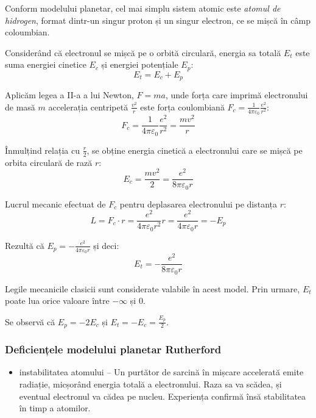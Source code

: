 Conform modelului planetar, cel mai simplu sistem atomic este
\emph{atomul de hidrogen}, format dintr-un singur proton și un singur electron,
ce se mișcă în câmp coloumbian.

Considerând că electronul se mișcă pe o orbită circulară, energia sa totală
$E_t$ este suma energiei cinetice $E_c$ și energiei potențiale $E_p$:
\[ E_t = E_c + E_p \]

Aplicăm legea a II-a a lui Newton, \( F = ma \), unde forța care imprimă
electronului de masă $m$ accelerația centripetă \( \frac{v^2}{r} \) este forța
coulombiană \( F_c = \frac{1}{4\pi\varepsilon_0} \frac{e^2}{r^2} \):
\[ F_c = \frac{1}{4\pi\varepsilon_0} \frac{e^2}{r^2} = \frac{mv^2}{r} \]

Înmulțind relația cu \( \frac{r}{2} \), se obține energia cinetică a
electronului care se mișcă pe orbita circulară de rază $r$:
\[ E_c = \frac{mv^2}{2} = \frac{e^2}{8\pi\varepsilon_0 r} \]

Lucrul mecanic efectuat de $F_c$ pentru deplasarea electronului pe distanța
$r$:
\[
    L = F_c \cdot r = \frac{e^2}{4\pi\varepsilon_0 r^2} r
    = \frac{e^2}{4\pi\varepsilon_0 r} = - E_p
\]

Rezultă că \( E_p = - \frac{e^2}{4\pi\varepsilon_0 r} \) și deci:
\[ E_t = - \frac{e^2}{8\pi\varepsilon_0 r} \]

Legile mecanicile clasicii sunt considerate valabile în acest model. Prin urmare, $E_t$ poate lua orice valoare între $-\infty$ și 0.

Se observă că \( E_p = -2E_c \) și \( E_t = -E_c = \frac{E_p}{2} \).

\subsubsection*{Deficiențele modelului planetar Rutherford}

\begin{itemize}
    \item instabilitatea atomului -- Un purtător de sarcină în mișcare
        accelerată emite radiație, micșorând energia totală a electronului.
        Raza sa va scădea, și eventual electronul va cădea pe nucleu.
        Experiența confirmă însă stabilitatea în timp a atomilor.
\end{itemize}
